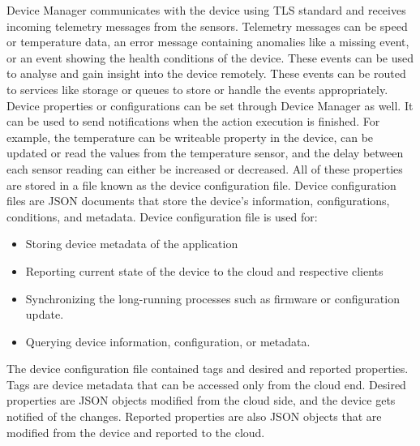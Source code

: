\documentclass[12pt,a4paper]{article}
\begin{document}
{Device Manager communicates with the device using TLS standard and receives incoming telemetry messages from the sensors. Telemetry messages can be speed or temperature data, an error message containing anomalies like a missing event, or an event showing the health conditions of the device. These events can be used to analyse and gain insight into the device remotely. These events can be routed to services like storage or queues to store or handle the events appropriately. \cite{r36} \\

Device properties or configurations can be set through Device Manager as well. It can be used to send notifications when the action execution is finished. For example, the temperature can be writeable property in the device, can be updated or read the values from the temperature sensor, and the delay between each sensor reading can either be increased or decreased. All of these properties are stored in a file known as the device configuration file. Device configuration files are JSON documents that store the device's information, configurations, conditions, and metadata. Device configuration file is used for: \cite{r36}

\begin{itemize}

\item Storing device metadata of the application \cite{r36}
\item Reporting current state of the device to the cloud and respective clients \cite{r36}
\item Synchronizing the long-running processes such as firmware or configuration update. \cite{r36}
\item Querying device information, configuration, or metadata. \cite{r36}

\end{itemize}

The device configuration file contained tags and desired and reported properties. Tags are device metadata that can be accessed only from the cloud end. Desired properties are JSON objects modified from the cloud side, and the device gets notified of the changes. Reported properties are also JSON objects that are modified from the device and reported to the cloud. \cite{r36} \\

\begin{landscape}


\end{landscape}}
\end{document}
